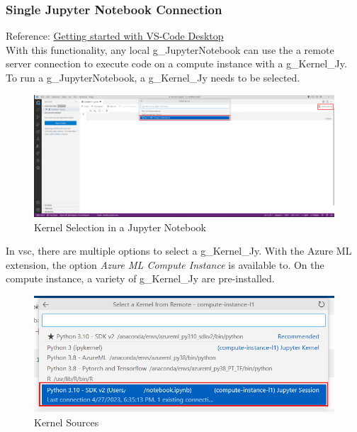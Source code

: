 \subsubsection{Single Jupyter Notebook Connection}
Reference: \href{https://learn.microsoft.com/de-de/azure/machine-learning/how-to-launch-vs-code-remote?view=azureml-api-2&tabs=vscode-desktop}{Getting started with VS-Code Desktop}\\

With this functionality, any local \gls{g_JupyterNotebook} can use the a remote server connection to execute code on a compute instance with a \gls{g_Kernel_Jy}.\\

To run a \gls{g_JupyterNotebook}, a \gls{g_Kernel_Jy} needs to be selected.

\begin{figure}[H]
	\centering
	\includegraphics[scale = 0.3]{attachment/chapter_AML/Scc015}
	\caption{Kernel Selection in a Jupyter Notebook}
\end{figure}

In \gls{vsc}, there are multiple options to select a \gls{g_Kernel_Jy}. With the Azure ML extension, the option \textit{Azure ML Compute Instance} is available to.  On the compute instance, a variety of \gls{g_Kernel_Jy} are pre-installed.
\begin{figure}[H]
	\centering
	\includegraphics[scale = 0.3]{attachment/chapter_AML/Scc016}
	\caption{Kernel Sources}
\end{figure}

